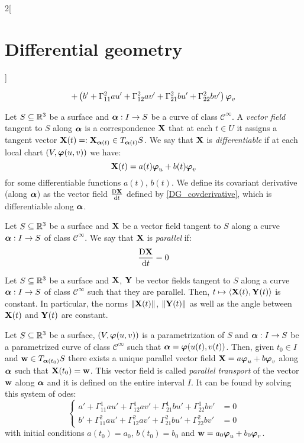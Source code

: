\documentclass[../../../main_math.tex]{subfiles}
\begin{document}
\begin{multicols}{2}[\section{Differential geometry}]
\begin{proposition}
\begin{multline}
      +\left(b'+\Gamma_{11}^2au'+\Gamma_{12}^2av'+\Gamma_{21}^2bu'+\Gamma_{22}^2bv'\right)\boldsymbol{\mathrm{\varphi}}_v
    \end{multline}
  \end{proposition}
  \begin{definition}
    Let $S\subseteq\mathbb{R}^3$ be a surface and $\boldsymbol{\mathrm{\alpha}}:I\rightarrow S$ be a curve of class $\mathcal{C}^\infty$. A \emph{vector field} tangent to $S$ along $\boldsymbol{\mathrm{\alpha}}$ is a correspondence $\boldsymbol{\mathrm{X}}$ that at each $t\in U$ it assigns a tangent vector $\boldsymbol{\mathrm{X}}(t)=:\boldsymbol{\mathrm{X}}_{\boldsymbol{\mathrm{\alpha}}(t)}\in T_{\boldsymbol{\mathrm{\alpha}}(t)}S$. We say that $\boldsymbol{\mathrm{X}}$ is \emph{differentiable} if at each local chart $(V,\boldsymbol{\mathrm{\varphi}}(u,v))$ we have: $$\boldsymbol{\mathrm{X}}(t)=a(t)\boldsymbol{\mathrm{\varphi}}_u+b(t)\boldsymbol{\mathrm{\varphi}}_v$$ for some differentiable functions $a(t)$, $b(t)$. We define its covariant derivative (along $\boldsymbol{\mathrm{\alpha}}$) as the vector field $\frac{\text{D}\boldsymbol{\mathrm{X}}}{\dd{t}}$ defined by \cref{DG_covderivative}, which is differentiable along $\boldsymbol{\mathrm{\alpha}}$.
  \end{definition}
  \begin{definition}
    Let $S\subseteq\mathbb{R}^3$ be a surface and $\boldsymbol{\mathrm{X}}$ be a vector field tangent to $S$ along a curve $\boldsymbol{\mathrm{\alpha}}:I\rightarrow S$ of class $\mathcal{C}^\infty$. We say that $\boldsymbol{\mathrm{X}}$ is \emph{parallel} if: $$\frac{\text{D}\boldsymbol{\mathrm{X}}}{\dd{t}}=0$$
  \end{definition}
  \begin{proposition}
    Let $S\subseteq\mathbb{R}^3$ be a surface and $\boldsymbol{\mathrm{X}}$, $\boldsymbol{\mathrm{Y}}$ be vector fields tangent to $S$ along a curve $\boldsymbol{\mathrm{\alpha}}:I\rightarrow S$ of class $\mathcal{C}^\infty$ such that they are parallel. Then, $t\mapsto\langle \boldsymbol{\mathrm{X}}(t),\boldsymbol{\mathrm{Y}}(t)\rangle$ is constant. In particular, the norms $\|\boldsymbol{\mathrm{X}}(t)\|$, $\|\boldsymbol{\mathrm{Y}}(t)\|$ as well as the angle between $\boldsymbol{\mathrm{X}}(t)$ and $\boldsymbol{\mathrm{Y}}(t)$ are constant.
  \end{proposition}
  \begin{proposition}
    Let $S\subseteq\mathbb{R}^3$ be a surface, $(V,\boldsymbol{\mathrm{\varphi}}(u,v))$ is a parametrization of $S$ and $\boldsymbol{\mathrm{\alpha}}: I\rightarrow S$ be a parametrized curve of class $\mathcal{C}^\infty$ such that $\boldsymbol{\mathrm{\alpha}}=\boldsymbol{\mathrm{\varphi}}(u(t),v(t))$. Then, given $t_0\in I$ and $\boldsymbol{\mathrm{w}}\in T_{\boldsymbol{\mathrm{\alpha}}(t_0)}S$ there exists a unique parallel vector field $\boldsymbol{\mathrm{X}}=a\boldsymbol{\mathrm{\varphi}}_u+b\boldsymbol{\mathrm{\varphi}}_v$ along $\boldsymbol{\mathrm{\alpha}}$ such that $\boldsymbol{\mathrm{X}}(t_0)=\boldsymbol{\mathrm{w}}$. This vector field is called \emph{parallel transport} of the vector $\boldsymbol{\mathrm{w}}$ along $\boldsymbol{\mathrm{\alpha}}$ and it is defined on the entire interval $I$. It can be found by solving this system of odes:
    $$\left\{
      \begin{aligned}
        a'+\Gamma_{11}^1au'+\Gamma_{12}^1av'+\Gamma_{21}^1bu'+\Gamma_{22}^1bv' & =0 \\
        b'+\Gamma_{11}^2au'+\Gamma_{12}^2av'+\Gamma_{21}^2bu'+\Gamma_{22}^2bv' & =0
      \end{aligned}
      \right.
    $$
    with initial conditions $a(t_0)=a_0$, $b(t_0)=b_0$ and $\boldsymbol{\mathrm{w}}=a_0\boldsymbol{\mathrm{\varphi}}_u+b_0\boldsymbol{\mathrm{\varphi}}_v$.
  \end{proposition}

\end{multicols}
\end{document}

